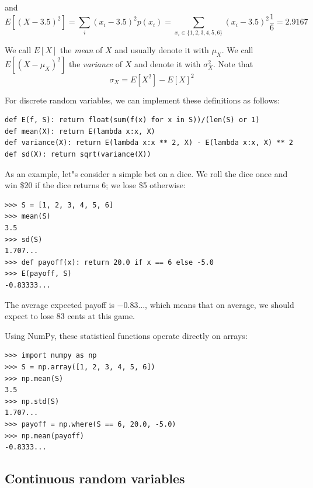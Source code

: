 \documentclass[justified, sixbynine]{tufte-book}
\def\ft{\small\tt}
\theoremstyle{plain}%
\newtheorem * {corollary}{Corollary}
\theoremstyle{definition}
\theoremstyle{remark}
\newtheorem * {remark}{Remark}
\newtheorem * {note}{Note}
\begin{document}
\begin{fullwidth}
and
\begin{equation}
E[(X-3.5)^2]=\sum_i(x_i-3.5)^2p(x_i)=\sum_{x_i\in
\{1, 2, 3, 4, 5, 6\}}(x_i-3.5)^2\frac 16=2.9167
\end{equation}

We call $E[X]$ the {\it mean} of $X$ and usually denote it with $\mu _X$.
We call $E[(X-\mu _X)^2]$ the {\it variance} of $X$ and denote it with $\sigma _X^2$. Note that
\begin{equation}
\sigma _X=E[X^2]-E[X]^2
\end{equation}

For discrete random variables, we can implement these definitions as follows:

\begin{lstlisting}[caption={in file: {\ft nlib.py}}]
def E(f, S): return float(sum(f(x) for x in S))/(len(S) or 1)
def mean(X): return E(lambda x:x, X)
def variance(X): return E(lambda x:x ** 2, X) - E(lambda x:x, X) ** 2
def sd(X): return sqrt(variance(X))
\end{lstlisting}

As an example, let"s consider a simple bet on a dice. We roll the dice once and win \$20 if the dice returns 6; we lose \$5 otherwise:

\begin{lstlisting}[caption={in file: {\ft nlib.py}}]
>>> S = [1, 2, 3, 4, 5, 6]
>>> mean(S)
3.5
>>> sd(S)
1.707...
>>> def payoff(x): return 20.0 if x == 6 else -5.0
>>> E(payoff, S)
-0.83333...
\end{lstlisting}

The average expected payoff is $-0.83...$, which means that on average, we should expect to lose 83 cents at this game.

Using NumPy, these statistical functions operate directly on arrays:

\begin{lstlisting}
>>> import numpy as np
>>> S = np.array([1, 2, 3, 4, 5, 6])
>>> np.mean(S)
3.5
>>> np.std(S)
1.707...
>>> payoff = np.where(S == 6, 20.0, -5.0)
>>> np.mean(payoff)
-0.8333...
\end{lstlisting}

\goodbreak\subsection{Continuous random variables}


\end{fullwidth}
\end{document}
